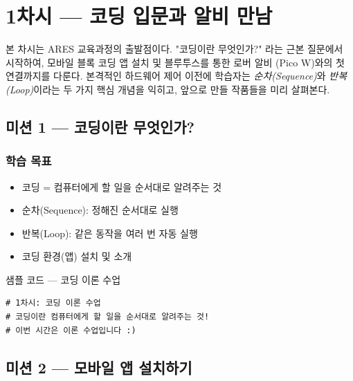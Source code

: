 \section{1차시 --- 코딩 입문과 알비 만남}
\label{sec:ch01}

본 차시는 ARES 교육과정의 출발점이다. "코딩이란 무엇인가?" 라는 근본
질문에서 시작하여, 모바일 블록 코딩 앱 설치 및 블루투스를 통한 로버 알비
(Pico W)와의 첫 연결까지를 다룬다. 본격적인 하드웨어 제어 이전에 학습자는
\emph{순차(Sequence)}와 \emph{반복(Loop)}이라는 두 가지 핵심 개념을 익히고,
앞으로 만들 작품들을 미리 살펴본다.

\subsection{미션 1 --- 코딩이란 무엇인가?}
\label{subsec:ch01-m1}

\begin{storybox}
\end{storybox}

\subsubsection*{학습 목표}
\begin{itemize}[leftmargin=1.4em]
  \item 코딩 = 컴퓨터에게 할 일을 순서대로 알려주는 것
  \item 순차(Sequence): 정해진 순서대로 실행
  \item 반복(Loop): 같은 동작을 여러 번 자동 실행
  \item 코딩 환경(앱) 설치 및 소개
\end{itemize}

\begin{labbox}{샘플 코드 --- 코딩 이론 수업}
\begin{verbatim}
# 1차시: 코딩 이론 수업
# 코딩이란 컴퓨터에게 할 일을 순서대로 알려주는 것!
# 이번 시간은 이론 수업입니다 :)
\end{verbatim}
\end{labbox}

\subsection{미션 2 --- 모바일 앱 설치하기}
\label{subsec:ch01-m2}

